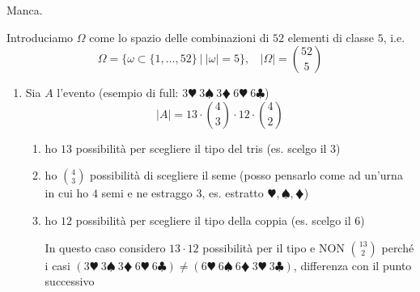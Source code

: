 \Soluzione

Manca.

\Soluzione

Introduciamo $\Omega $ come lo spazio delle combinazioni di $52$ elementi di classe $5$, i.e.
\begin{equation*}
	\Omega =\{\omega \subset \{1,\dots ,52\} \ |\ | \omega | =5\} ,\ \ \ \ | \Omega | =\binom{52}{5}
\end{equation*}
\begin{enumerate}
	\item Sia $A$ l'evento  (esempio di full: $3\varheartsuit \ 3\spadesuit \ 3\vardiamondsuit \ 6\varheartsuit \ 6\clubsuit $)\begin{equation*}
	| A| =13\cdot \binom{4}{3} \cdot 12\cdot \binom{4}{2}
	\end{equation*}
	\begin{enumerate}
		\item ho $13$ possibilità per scegliere il tipo del tris (es. scelgo il $3$)
		\item ho $\binom{4}{3}$ possibilità di scegliere il seme (posso pensarlo come ad un'urna in cui ho $4$ semi e ne estraggo $3$, es. estratto $\varheartsuit ,\spadesuit ,\vardiamondsuit $)
		\item ho $12$ possibilità per scegliere il tipo della coppia (es. scelgo il $6$)

		\begin{oss}
			In questo caso considero $13\cdot 12$ possibilità per il tipo e NON $\binom{13}{2}$ perché i casi $(3\varheartsuit \ 3\spadesuit \ 3\vardiamondsuit \ 6\varheartsuit \ 6\clubsuit) \neq (6\varheartsuit \ 6\spadesuit \ 6\vardiamondsuit \ 3\varheartsuit \ 3\clubsuit)$, differenza con il punto successivo
		\end{oss}


\end{enumerate}
\end{enumerate}
